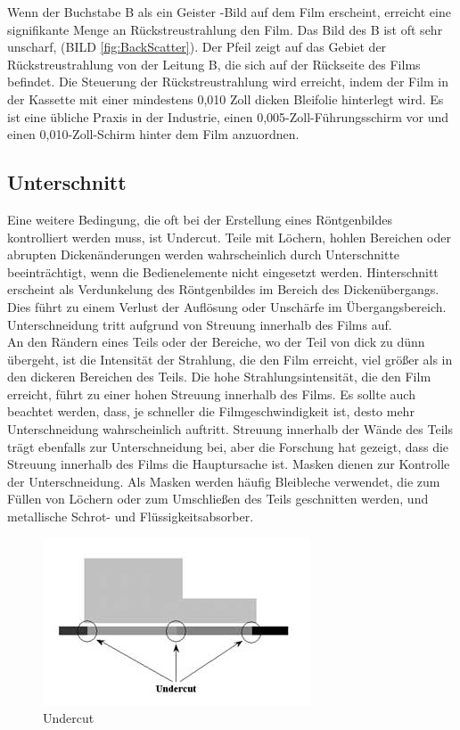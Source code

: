 Wenn der Buchstabe B als ein Geister -Bild auf dem Film erscheint, erreicht eine signifikante Menge an Rückstreustrahlung den Film. Das Bild des B ist oft sehr unscharf,
(BILD \ref{fig:BackScatter}). Der Pfeil zeigt auf das Gebiet der Rückstreustrahlung von der Leitung B, die sich auf der Rückseite des Films befindet. Die Steuerung der Rückstreustrahlung wird erreicht, indem der Film in der Kassette mit einer mindestens 0,010 Zoll dicken Bleifolie hinterlegt wird. Es ist eine übliche Praxis in der Industrie, einen 0,005-Zoll-Führungsschirm vor und einen 0,010-Zoll-Schirm hinter dem Film anzuordnen.
\subsection{Unterschnitt}
Eine weitere Bedingung, die oft bei der Erstellung eines Röntgenbildes kontrolliert werden muss, ist Undercut. Teile mit Löchern, hohlen Bereichen oder abrupten Dickenänderungen werden wahrscheinlich durch Unterschnitte beeinträchtigt, wenn die Bedienelemente nicht eingesetzt werden. Hinterschnitt erscheint als Verdunkelung des Röntgenbildes im Bereich des Dickenübergangs. Dies führt zu einem Verlust der Auflösung oder Unschärfe im Übergangsbereich. Unterschneidung tritt aufgrund von Streuung innerhalb des Films auf.\\

An den Rändern eines Teils oder der Bereiche, wo der Teil von dick zu dünn übergeht, ist die Intensität der Strahlung, die den Film erreicht, viel größer als in den dickeren Bereichen des Teils. Die hohe Strahlungsintensität, die den Film erreicht, führt zu einer hohen Streuung innerhalb des Films. Es sollte auch beachtet werden, dass, je schneller die Filmgeschwindigkeit ist, desto mehr Unterschneidung wahrscheinlich auftritt. Streuung innerhalb der Wände des Teils trägt ebenfalls zur Unterschneidung bei, aber die Forschung hat gezeigt, dass die Streuung innerhalb des Films die Hauptursache ist. Masken dienen zur Kontrolle der Unterschneidung. Als Masken werden häufig Bleibleche verwendet, die zum Füllen von Löchern oder zum Umschließen des Teils geschnitten werden, und metallische Schrot- und Flüssigkeitsabsorber.

\begin{figure}[htb]
  \centering 
 \includegraphics[scale=0.9]{img/Undercut.jpg}
 \caption{Undercut}
  \label{fig:Undercut}
\end{figure}

